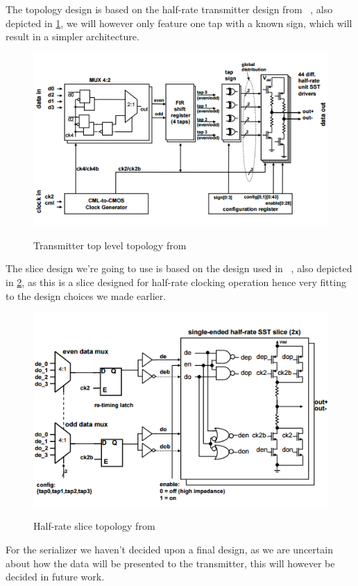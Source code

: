 The topology design is based on the half-rate transmitter design from ~\cite{menolfi2007a}, also depicted in \ref{fig:topology1}, we will however only feature one tap with a known sign, which will result in a simpler architecture.

\begin{figure}[H]
  \centering
  {\includegraphics[scale=0.55]{img/topology1.png}}
  \caption{Transmitter top level topology from ~\cite{menolfi2007a}}
  \label{fig:topology1}
\end{figure}


The slice design we're going to use is based on the design used in ~\cite{menolfi2007a}, also depicted in \ref{fig:topology0}, as this is a slice designed for half-rate clocking operation hence very fitting to the design choices we made earlier.

\begin{figure}[H]
  \centering
  {\includegraphics[scale=0.55]{img/topology0.png}}
  \caption{Half-rate slice topology from ~\cite{menolfi2007a}}
  \label{fig:topology0}
\end{figure}

For the serializer we haven't decided upon a final design, as we are uncertain about how the data will be presented to the transmitter, this will however be decided in future work.